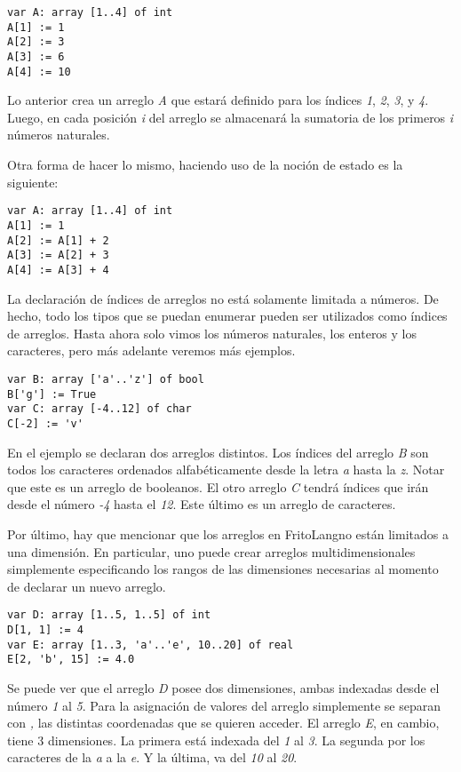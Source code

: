 \documentclass{article}
\newcommand{\Lang}{FritoLang} %
\begin{document}
\begin{lstlisting}
var A: array [1..4] of int
A[1] := 1 
A[2] := 3
A[3] := 6
A[4] := 10
\end{lstlisting}

Lo anterior crea un arreglo \textit{A} que estará definido para los índices \textit{1}, \textit{2}, \textit{3}, y \textit{4}.
Luego, en cada posición \textit{i} del arreglo se almacenará la sumatoria de los primeros \textit{i} números naturales.

Otra forma de hacer lo mismo, haciendo uso de la noción de estado es la siguiente:

\begin{lstlisting}
var A: array [1..4] of int
A[1] := 1 
A[2] := A[1] + 2
A[3] := A[2] + 3
A[4] := A[3] + 4
\end{lstlisting}

La declaración de índices de arreglos no está solamente limitada a números.
De hecho, todo los tipos que se puedan enumerar pueden ser utilizados como índices de arreglos.
Hasta ahora solo vimos los números naturales, los enteros y los caracteres, pero más adelante veremos más ejemplos.

\begin{lstlisting}
var B: array ['a'..'z'] of bool
B['g'] := True
var C: array [-4..12] of char
C[-2] := 'v'
\end{lstlisting}

En el ejemplo se declaran dos arreglos distintos.
Los índices del arreglo \textit{B} son todos los caracteres ordenados alfabéticamente desde la letra \textit{a} hasta la \textit{z}.
Notar que este es un arreglo de booleanos.
El otro arreglo \textit{C} tendrá índices que irán desde el número \textit{-4} hasta el \textit{12}.
Este último es un arreglo de caracteres.

Por último, hay que mencionar que los arreglos en \Lang\space no están limitados a una dimensión.
En particular, uno puede crear arreglos multidimensionales simplemente especificando los rangos de las dimensiones necesarias al momento de declarar un nuevo arreglo.

\begin{lstlisting}
var D: array [1..5, 1..5] of int
D[1, 1] := 4
var E: array [1..3, 'a'..'e', 10..20] of real
E[2, 'b', 15] := 4.0
\end{lstlisting}

Se puede ver que el arreglo \textit{D} posee dos dimensiones, ambas indexadas desde el número \textit{1} al \textit{5}.
Para la asignación de valores del arreglo simplemente se separan con \textit{,} las distintas coordenadas que se quieren acceder.
El arreglo \textit{E}, en cambio, tiene 3 dimensiones.
La primera está indexada del \textit{1} al \textit{3}.
La segunda por los caracteres de la \textit{a} a la \textit{e}.
Y la última, va del \textit{10} al \textit{20}.
\end{document}
